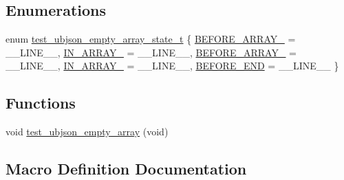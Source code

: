 \subsection*{Enumerations}
\begin{DoxyCompactItemize}
\item 
enum \hyperlink{test-ubjson-empty-array_8c_a21d764b9e7f88c76539b4608ec752aa3}{test\+\_\+ubjson\+\_\+empty\+\_\+array\+\_\+state\+\_\+t} \{ \newline
\hyperlink{test-ubjson-empty-array_8c_a21d764b9e7f88c76539b4608ec752aa3ad26d44b8948fbf2e35a247b860ca5991}{B\+E\+F\+O\+R\+E\+\_\+\+A\+R\+R\+A\+Y\+\_} = \+\_\+\+\_\+\+L\+I\+N\+E\+\_\+\+\_\+, 
\hyperlink{test-ubjson-empty-array_8c_a21d764b9e7f88c76539b4608ec752aa3a672978d25c58ae5da5a70fee946428f3}{I\+N\+\_\+\+A\+R\+R\+A\+Y\+\_} = \+\_\+\+\_\+\+L\+I\+N\+E\+\_\+\+\_\+, 
\hyperlink{test-ubjson-empty-array_8c_a21d764b9e7f88c76539b4608ec752aa3a3e3b98c703aad8532742a1cef5291b75}{B\+E\+F\+O\+R\+E\+\_\+\+A\+R\+R\+A\+Y\+\_} = \+\_\+\+\_\+\+L\+I\+N\+E\+\_\+\+\_\+, 
\hyperlink{test-ubjson-empty-array_8c_a21d764b9e7f88c76539b4608ec752aa3aa6e89c744bfe6caabbf5e4001a1d6bcd}{I\+N\+\_\+\+A\+R\+R\+A\+Y\+\_} = \+\_\+\+\_\+\+L\+I\+N\+E\+\_\+\+\_\+, 
\newline
\hyperlink{test-ubjson-empty-array_8c_a21d764b9e7f88c76539b4608ec752aa3aff53713147683ab221564d81c53a00e3}{B\+E\+F\+O\+R\+E\+\_\+\+E\+ND} = \+\_\+\+\_\+\+L\+I\+N\+E\+\_\+\+\_\+
 \}
\end{DoxyCompactItemize}
\subsection*{Functions}
\begin{DoxyCompactItemize}
\item 
void \hyperlink{group__unittests_ga9da1a8e30a96a87edc4a759e4742b998}{test\+\_\+ubjson\+\_\+empty\+\_\+array} (void)
\end{DoxyCompactItemize}


\subsection{Macro Definition Documentation}
\mbox{\label{test-ubjson-empty-array_8c_a3a0f560c4fe9cc5130773a84ff587b9e}} 
